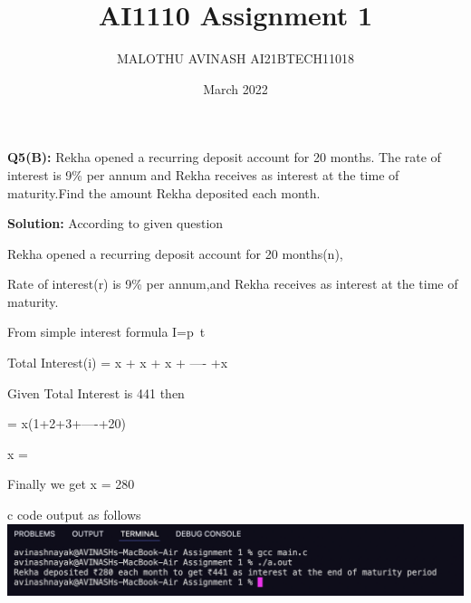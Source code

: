 \documentclass[12pt, twocolumn]{article}
\title{AI1110 Assignment 1}
\author{MALOTHU AVINASH AI21BTECH11018}
\date{March 2022}
\newcommand{\solution}{\noindent \textbf{Solution: }}
\begin{document}
\maketitle
\begin{problem}
\textbf{Q5(B):} Rekha opened a recurring deposit account for 20 months. The rate of interest is 9\% per annum and Rekha receives  as interest at the time of maturity.Find the amount Rekha deposited each month.
\end{problem}

\solution 
According to given question

Rekha opened a recurring deposit account for 20 months(n),

Rate of interest(r) is 9\% per annum,and Rekha receives  as interest at the time of maturity.

From simple interest formula I=p\cdot\ t\cdot{}

\implies Total Interest(i) = x\cdot{}\cdot{} + x\cdot{}\cdot{} + x\cdot{}\cdot{} +
---- +x\cdot{}\cdot{}

Given Total Interest is 441 then

 = x\cdot{}(1+2+3+----+20)

\implies x = 

Finally we get x = 280

c code output as follows
\includegraphics[width=\textwidth]{solution.png}
\end{document}
